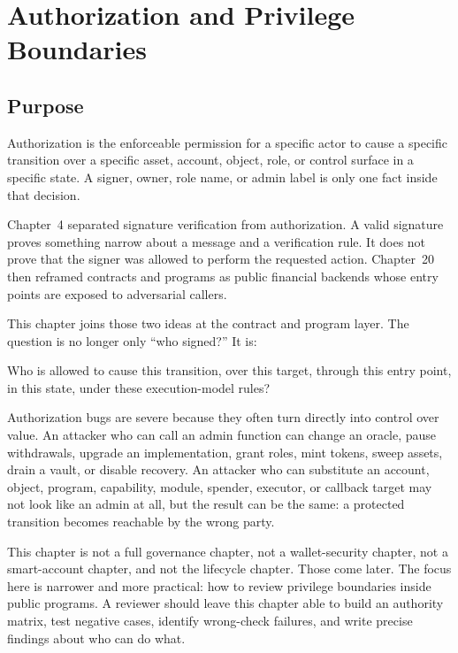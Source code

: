 \chapter{Authorization and Privilege Boundaries}

\section{Purpose}

\begin{principlebox}
Authorization is the enforceable permission for a specific actor to cause a specific transition over a specific asset, account, object, role, or control surface in a specific state. A signer, owner, role name, or admin label is only one fact inside that decision.
\end{principlebox}

Chapter~4 separated signature verification from authorization. A valid signature proves something narrow about a message and a verification rule. It does not prove that the signer was allowed to perform the requested action. Chapter~20 then reframed contracts and programs as public financial backends whose entry points are exposed to adversarial callers.

This chapter joins those two ideas at the contract and program layer. The question is no longer only ``who signed?'' It is:

\begin{codeblock}
Who is allowed to cause this transition,
over this target,
through this entry point,
in this state,
under these execution-model rules?
\end{codeblock}

Authorization bugs are severe because they often turn directly into control over value. An attacker who can call an admin function can change an oracle, pause withdrawals, upgrade an implementation, grant roles, mint tokens, sweep assets, drain a vault, or disable recovery. An attacker who can substitute an account, object, program, capability, module, spender, executor, or callback target may not look like an admin at all, but the result can be the same: a protected transition becomes reachable by the wrong party.

This chapter is not a full governance chapter, not a wallet-security chapter, not a smart-account chapter, and not the lifecycle chapter. Those come later. The focus here is narrower and more practical: how to review privilege boundaries inside public programs. A reviewer should leave this chapter able to build an authority matrix, test negative cases, identify wrong-check failures, and write precise findings about who can do what.

